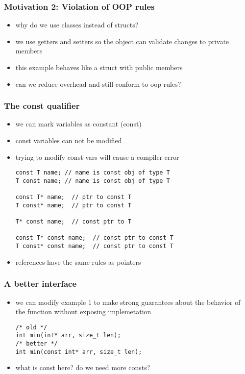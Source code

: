 \begin{frame}[fragile]
    \frametitle{Motivation 2: Violation of OOP rules}
    \begin{itemize}
        \begin{lstlisting}[numbers=none]
Person p("Alice");
cout << p.getName(); // print "Alice"
p.getName() = "";
cout << p.getName(); // print ""
        \end{lstlisting}
    \item why do we use classes instead of structs?
    \item we use getters and setters so the object can validate changes to private members
    \item this example behaves like a struct with public members
    \item can we reduce overhead and still conform to oop rules?
    \end{itemize}
\end{frame}

\begin{frame}[fragile]
    \frametitle{The const qualifier}
    \begin{itemize}
    \item we can mark variables as constant (const)
    \item const variables can not be modified
    \item trying to modify const vars will cause a compiler error
        \begin{lstlisting}[numbers=none]
const T name; // name is const obj of type T
T const name; // name is const obj of type T

const T* name;  // ptr to const T
T const* name;  // ptr to const T

T* const name;  // const ptr to T

const T* const name;  // const ptr to const T
T const* const name;  // const ptr to const T
        \end{lstlisting}
    \item references have the same rules as pointers
    \end{itemize}
\end{frame}

\begin{frame}[fragile]
    \frametitle{A better interface}
    \begin{itemize}
    \item we can modify example 1 to make strong guarantees about the behavior of the function without exposing implemetation
        \begin{lstlisting}[numbers=none]
/* old */
int min(int* arr, size_t len);
/* better */
int min(const int* arr, size_t len);
        \end{lstlisting}
    \item what is const here? do we need more consts?
    \end{itemize}
\end{frame}

